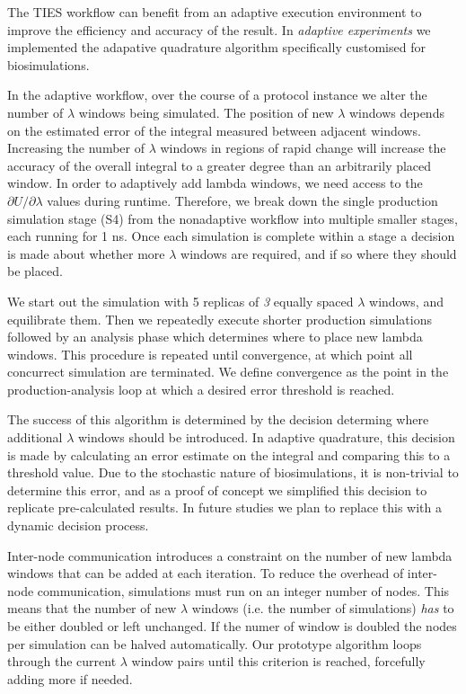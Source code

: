 The TIES workflow can benefit from an adaptive execution environment to improve
the efficiency and accuracy of the result. In \emph{adaptive experiments} we
implemented the adapative quadrature algorithm specifically customised for
biosimulations.

In the adaptive workflow, over the course of a protocol instance we alter
the number of $\lambda$ windows being simulated. The position of new $\lambda$
windows depends on the estimated error of the integral measured between
adjacent windows. Increasing the number of $\lambda$ windows in regions of
rapid change will increase the accuracy of the overall integral to a greater
degree than an
arbitrarily placed window. In order to adaptively add lambda windows, we need
access to the $\partial U/\partial\lambda$ values during runtime. Therefore, we break down the
single production simulation stage (S4) from the nonadaptive workflow into
multiple smaller stages, each running for 1 ns. Once each simulation is
complete within a stage a decision is made about whether more $\lambda$ windows
are required, and if so where they should be placed.

We start out the simulation with 5 replicas of \emph{3} equally spaced
$\lambda$ windows, and equilibrate them. 
Then we repeatedly execute 
shorter production simulations followed by an analysis phase which determines where to
place new lambda windows. 
This procedure is repeated until convergence, at which point all
concurrect simulation are terminated. 
We define convergence as the point in
the production-analysis loop at which a desired error threshold is
reached. 

The success of this algorithm is determined by the decision determing 
where additional $\lambda$ windows should be introduced.
In adaptive quadrature, this decision is made by
calculating an error estimate on the integral and comparing this to a threshold value. 
Due to the stochastic nature of biosimulations, it is
non-trivial to determine this error, and as a proof of concept we simplified
this decision to replicate pre-calculated results. In future studies we plan
to replace this with a dynamic decision process.

Inter-node communication introduces a constraint on the number of new lambda windows that can be added at each iteration. 
To reduce the overhead of inter-node communication, simulations must run on an integer number of nodes. This means that the
number of new $\lambda$ windows (i.e. the number of simulations) \emph{has} to be
either doubled or left unchanged. 
If the numer of window is doubled the nodes per simulation can  be halved automatically. 
Our prototype algorithm loops through the current $\lambda$ window pairs until this criterion is reached, forcefully adding more if needed.


